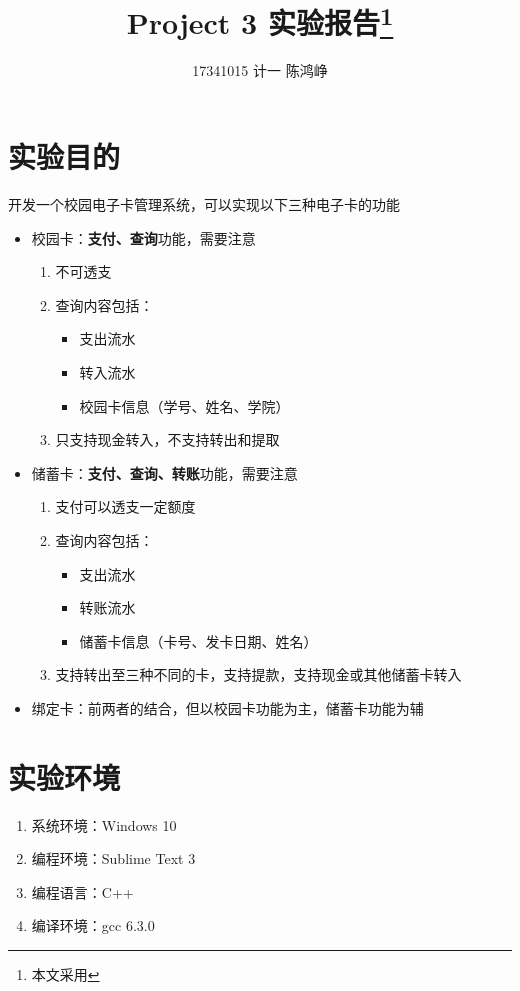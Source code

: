\documentclass[11pt,UTF8]{ctexart}
\title{Project 3 实验报告\protect\footnote{\color{red}本文采用\LaTeX进行编写}}
\author{17341015 计一 陈鸿峥}
\date{}
\begin{document}
\maketitle
\vspace{-50pt}%

\lstset{language=C++,escapechar=`}

\section{实验目的}
开发一个校园电子卡管理系统，可以实现以下三种电子卡的功能
\begin{itemize}
	\item 校园卡：\textbf{支付、查询}功能，需要注意
	\begin{enumerate}
		\item 不可透支
		\item 查询内容包括：
		\begin{itemize}
			\item 支出流水
			\item 转入流水
			\item 校园卡信息（学号、姓名、学院）
		\end{itemize}
		\item 只支持现金转入，不支持转出和提取
	\end{enumerate}
	\item 储蓄卡：\textbf{支付、查询、转账}功能，需要注意
	\begin{enumerate}
		\item 支付可以透支一定额度
		\item 查询内容包括：
		\begin{itemize}
			\item 支出流水
			\item 转账流水
			\item 储蓄卡信息（卡号、发卡日期、姓名）
		\end{itemize}
		\item 支持转出至三种不同的卡，支持提款，支持现金或其他储蓄卡转入
	\end{enumerate}
	\item 绑定卡：前两者的结合，但以校园卡功能为主，储蓄卡功能为辅
\end{itemize}


\section{实验环境}
\begin{enumerate}
	\item 系统环境：Windows 10
	\item 编程环境：Sublime Text 3
	\item 编程语言：C++
	\item 编译环境：gcc 6.3.0
\end{enumerate}
\end{document}
